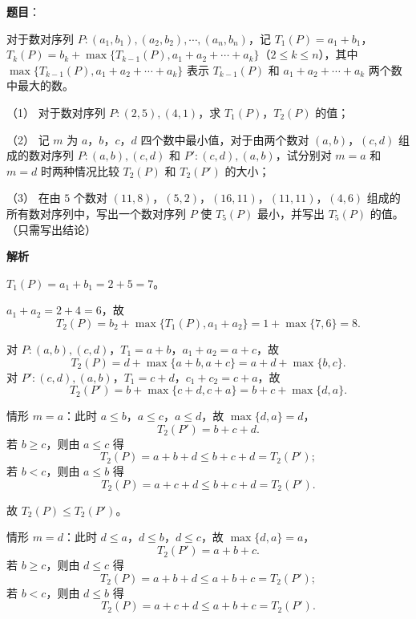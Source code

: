\begin{answer}

\textbf{题目}：

对于数对序列 $P:(a_1,b_1),(a_2,b_2),\cdots,(a_n,b_n)$，记 $T_1(P)=a_1+b_1$，$T_k(P)=b_k+\max\{T_{k-1}(P),a_1+a_2+\cdots+a_k\}$（$2\leqslant k\leqslant n$），其中 $\max\{T_{k-1}(P),a_1+a_2+\cdots+a_k\}$ 表示 $T_{k-1}(P)$ 和 $a_1+a_2+\cdots+a_k$ 两个数中最大的数。

（1） 对于数对序列 $P:(2,5),(4,1)$，求 $T_1(P)$，$T_2(P)$ 的值；

（2） 记 $m$ 为 $a$，$b$，$c$，$d$ 四个数中最小值，对于由两个数对 $(a,b)$，$(c,d)$ 组成的数对序列 $P:(a,b),(c,d)$ 和 $P':(c,d),(a,b)$，试分别对 $m=a$ 和 $m=d$ 时两种情况比较 $T_2(P)$ 和 $T_2(P')$ 的大小；

（3） 在由 $5$ 个数对 $(11,8)$，$(5,2)$，$(16,11)$，$(11,11)$，$(4,6)$ 组成的所有数对序列中，写出一个数对序列 $P$ 使 $T_5(P)$ 最小，并写出 $T_5(P)$ 的值。（只需写出结论）

\textbf{解析}


$T_1(P)=a_1+b_1=2+5=7$。

$a_1+a_2=2+4=6$，故
\nopagebreak[4]
\[T_2(P)=b_2+\max\{T_1(P),a_1+a_2\}=1+\max\{7,6\}=8 .\]


对 $P:(a,b),(c,d)$，$T_1=a+b$，$a_1+a_2=a+c$，故
\nopagebreak[4]
\[T_2(P)=d+\max\{a+b,a+c\}=a+d+\max\{b,c\} .\]
对 $P':(c,d),(a,b)$，$T_1=c+d$，$c_1+c_2=c+a$，故
\nopagebreak[4]
\[T_2(P')=b+\max\{c+d,c+a\}=b+c+\max\{d,a\} .\]

情形 $m=a$：此时 $a\leqslant b$，$a\leqslant c$，$a\leqslant d$，故 $\max\{d,a\}=d$，
\nopagebreak[4]
\[T_2(P')=b+c+d .\]
若 $b\geqslant c$，则由 $a\leqslant c$ 得
\nopagebreak[4]
\[T_2(P)=a+b+d\leqslant b+c+d=T_2(P');\]
若 $b<c$，则由 $a\leqslant b$ 得
\nopagebreak[4]
\[T_2(P)=a+c+d\leqslant b+c+d=T_2(P').\]

故 $T_2(P)\leqslant T_2(P')$。

情形 $m=d$：此时 $d\leqslant a$，$d\leqslant b$，$d\leqslant c$，故 $\max\{d,a\}=a$，
\nopagebreak[4]
\[T_2(P')=a+b+c .\]
若 $b\geqslant c$，则由 $d\leqslant c$ 得
\nopagebreak[4]
\[T_2(P)=a+b+d\leqslant a+b+c=T_2(P');\]
若 $b<c$，则由 $d\leqslant b$ 得
\nopagebreak[4]
\[T_2(P)=a+c+d\leqslant a+b+c=T_2(P').\]


\end{answer}
